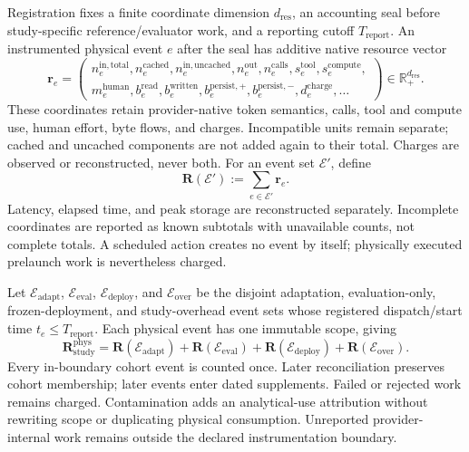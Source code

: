 \documentclass[10pt]{article} %
\providecommand{\1}{\mathbf{1}}  %
\theoremstyle{remark}
\theoremstyle{definition}
\begin{document}
Registration fixes a finite coordinate dimension $d_{\mathrm{res}}$,
an accounting seal before study-specific reference/evaluator work, and
a reporting cutoff $T_{\mathrm{report}}$. An instrumented physical event
$e$ after the seal has additive native resource vector
\begin{equation}
\mathbf r_e=
\left(
\begin{gathered}
n_e^{\mathrm{in,total}},n_e^{\mathrm{cached}},
n_e^{\mathrm{in,uncached}},n_e^{\mathrm{out}},n_e^{\mathrm{calls}},
s_e^{\mathrm{tool}},s_e^{\mathrm{compute}},\\[-1mm]
m_e^{\mathrm{human}},b_e^{\mathrm{read}},b_e^{\mathrm{written}},
b_e^{\mathrm{persist,+}},b_e^{\mathrm{persist,-}},
d_e^{\mathrm{charge}},\ldots
\end{gathered}
\right)\in\mathbb R_+^{d_{\mathrm{res}}}.
\label{eq:event-resource-vector}
\end{equation}
These coordinates retain provider-native token semantics, calls, tool
and compute use, human effort, byte flows, and charges. Incompatible
units remain separate; cached and uncached components are not added
again to their total. Charges are observed or reconstructed, never both.
For an event set $\mathcal E'$, define
\begin{equation}
\mathbf R(\mathcal E'):=\sum_{e\in\mathcal E'}\mathbf r_e.
\label{eq:event-resource-total}
\end{equation}
Latency, elapsed time, and peak storage are reconstructed separately.
Incomplete coordinates are reported as known subtotals with unavailable
counts, not complete totals. A scheduled action creates no event by
itself; physically executed prelaunch work is nevertheless charged.

Let $\mathcal E_{\mathrm{adapt}}$, $\mathcal E_{\mathrm{eval}}$,
$\mathcal E_{\mathrm{deploy}}$, and $\mathcal E_{\mathrm{over}}$ be
the disjoint adaptation, evaluation-only, frozen-deployment, and
study-overhead event sets whose registered dispatch/start time
$t_e\leq T_{\mathrm{report}}$. Each physical event has one immutable
scope, giving
\begin{equation}
\mathbf R_{\mathrm{study}}^{\mathrm{phys}}
=\mathbf R(\mathcal E_{\mathrm{adapt}})
+\mathbf R(\mathcal E_{\mathrm{eval}})
+\mathbf R(\mathcal E_{\mathrm{deploy}})
+\mathbf R(\mathcal E_{\mathrm{over}}).
\label{eq:physical-study-resources}
\end{equation}
Every in-boundary cohort event is counted once. Later reconciliation
preserves cohort membership; later events enter dated supplements.
Failed or rejected work remains charged. Contamination adds an
analytical-use attribution without rewriting scope or duplicating
physical consumption. Unreported provider-internal work remains outside
the declared instrumentation boundary.
\end{document}
